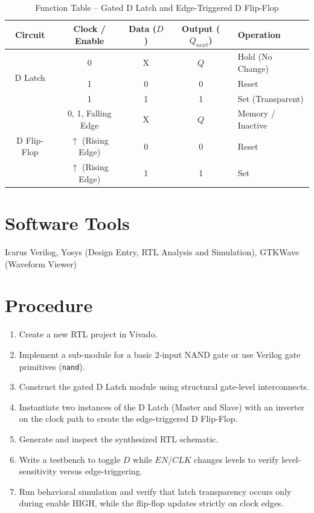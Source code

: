 \documentclass[12pt,a4paper]{report}
\begin{document}
\begin{table}[H]
    \centering
    \caption{Function Table -- Gated D Latch and Edge-Triggered D Flip-Flop}
    \begin{tabular}{|c|c|c|c|l|}
        \hline
        \textbf{Circuit} & \textbf{Clock / Enable} & \textbf{Data ($D$)} & \textbf{Output ($Q_{next}$)} & \textbf{Operation} \\
        \hline
        \multirow{3}{*}{D Latch} & 0 & X & $Q$ & Hold (No Change) \\
        \cline{2-5}
        & 1 & 0 & 0 & Reset \\
        \cline{2-5}
        & 1 & 1 & 1 & Set (Transparent) \\
        \hline
        \multirow{3}{*}{D Flip-Flop} & 0, 1, Falling Edge & X & $Q$ & Memory / Inactive \\
        \cline{2-5}
        & $\uparrow$ (Rising Edge) & 0 & 0 & Reset \\
        \cline{2-5}
        & $\uparrow$ (Rising Edge) & 1 & 1 & Set \\
        \hline
    \end{tabular}
\end{table}

\vspace{0.5cm}

\section{Software Tools}

Icarus Verilog, Yosys (Design Entry, RTL Analysis and Simulation), GTKWave (Waveform Viewer)

\section{Procedure}

\begin{enumerate}
    \item Create a new RTL project in Vivado.
    \item Implement a sub-module for a basic 2-input NAND gate or use Verilog gate primitives (\texttt{nand}).
    \item Construct the gated D Latch module using structural gate-level interconnects.
    \item Instantiate two instances of the D Latch (Master and Slave) with an inverter on the clock path to create the edge-triggered D Flip-Flop.
    \item Generate and inspect the synthesized RTL schematic.
    \item Write a testbench to toggle $D$ while $EN$/$CLK$ changes levels to verify level-sensitivity versus edge-triggering.
    \item Run behavioral simulation and verify that latch transparency occurs only during enable HIGH, while the flip-flop updates strictly on clock edges.
\end{enumerate}
\end{document}
